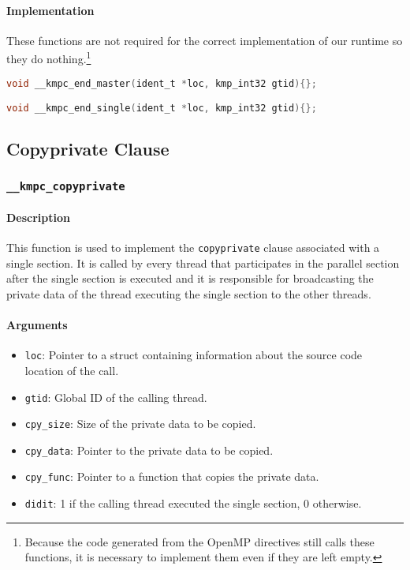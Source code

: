 \paragraph{Implementation} These functions are not required for the correct implementation of our
runtime so they do nothing.\footnote{Because the code generated from the OpenMP directives still
	calls these functions, it is necessary to implement them even if they are left empty.}

\begin{lstlisting}[language=C, caption={__kmpc_end_master and __kmpc_end_single},
                   label={lst:kmpc-end-master}, escapechar=@]
void __kmpc_end_master(ident_t *loc, kmp_int32 gtid){};

void __kmpc_end_single(ident_t *loc, kmp_int32 gtid){};
\end{lstlisting}

\subsection{Copyprivate Clause}

\subsubsection{\texttt{\_\_kmpc\_copyprivate}}

\paragraph{Description} This function is used to implement the \texttt{copyprivate} clause
associated with a single section. It is called by every thread that participates in the parallel
section after the single section is executed and it is responsible for broadcasting the private data
of the thread executing the single section to the other threads.

\paragraph{Arguments}
\begin{itemize}
	\item \texttt{loc}: Pointer to a struct containing information about the source code location
	      of the call.
	\item \texttt{gtid}: Global ID of the calling thread.
	\item \texttt{cpy\_size}: Size of the private data to be copied.
	\item \texttt{cpy\_data}: Pointer to the private data to be copied.
	\item \texttt{cpy\_func}: Pointer to a function that copies the private data.
	\item \texttt{didit}: 1 if the calling thread executed the single section, 0 otherwise.
\end{itemize}

